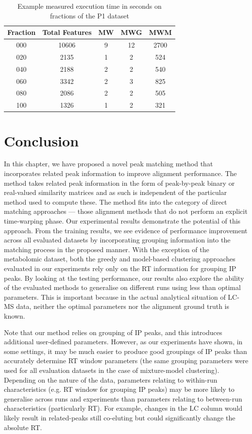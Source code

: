 \begin{table}[!htbp]
\noindent \begin{centering}
\begin{tabular}{|c|c|c|c|c|}
\hline 
\textbf{Fraction} & \textbf{Total Features} & \textbf{MW} & \textbf{MWG} & \textbf{MWM}\tabularnewline
\hline 
\hline 
000 & 10606 & 9 & 12 & 2700\tabularnewline
\hline 
020 & 2135 & 1 & 2 & 524\tabularnewline
\hline 
040 & 2188 & 2 & 2 & 540\tabularnewline
\hline 
060 & 3342 & 2 & 3 & 825\tabularnewline
\hline 
080 & 2086 & 2 & 2 & 505\tabularnewline
\hline 
100 & 1326 & 1 & 2 & 321\tabularnewline
\hline 
\end{tabular}
\par\end{centering}
\caption{\label{tab:Running-Time-P1}Example measured execution time in seconds on fractions of the P1 dataset}
\end{table}

\section{Conclusion}

\label{sec:conc}
In this chapter, we have proposed a novel peak matching method that incorporates related peak information to improve alignment performance. The method takes related peak information in the form of peak-by-peak binary or real-valued similarity matrices and as such is independent of the particular method used to compute these. The method fits into the category of direct matching approaches --- those alignment methods that do not perform an explicit time-warping phase. Our experimental results demonstrate the potential of this approach. From the training results, we see evidence of performance improvement across all evaluated datasets by incorporating grouping information into the matching process in the proposed manner. With the exception of the metabolomic dataset, both the greedy and model-based clustering approaches evaluated in our experiments rely only on the \ac{RT} information for grouping IP peaks. By looking at the testing performance, our results also explore the ability of the evaluated methods to generalise on different runs using less than optimal parameters. This is important because in the actual analytical situation of LC-MS data, neither the optimal parameters nor the alignment ground truth is known. 

Note that our method relies on grouping of IP peaks, and this introduces additional user-defined parameters. However, as our experiments have shown, in some settings, it may be much easier to produce good groupings of IP peaks than accurately determine \ac{RT} window parameters (the same grouping parameters were used for all evaluation datasets in the case of mixture-model clustering). Depending on the nature of the data, parameters relating to within-run characteristics (e.g. \ac{RT} window for grouping IP peaks) may be more likely to generalise across runs and experiments than parameters relating to between-run characteristics (particularly \ac{RT}). For example, changes in the \ac{LC} column would likely result in related-peaks still co-eluting but could significantly change the absolute \ac{RT}. 


